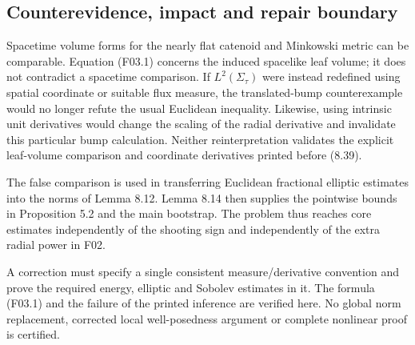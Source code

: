 \documentclass[10pt]{article}
\begin{document}
\subsection*{Counterevidence, impact and repair boundary}
Spacetime volume forms for the nearly flat catenoid and Minkowski metric can be comparable. Equation (F03.1) concerns the induced spacelike leaf volume; it does not contradict a spacetime comparison. If \(L^2(\Sigma_\tau)\) were instead redefined using spatial coordinate or suitable flux measure, the translated-bump counterexample would no longer refute the usual Euclidean inequality. Likewise, using intrinsic unit derivatives would change the scaling of the radial derivative and invalidate this particular bump calculation. Neither reinterpretation validates the explicit leaf-volume comparison and coordinate derivatives printed before (8.39).\par
The false comparison is used in transferring Euclidean fractional elliptic estimates into the norms of Lemma 8.12. Lemma 8.14 then supplies the pointwise bounds in Proposition 5.2 and the main bootstrap. The problem thus reaches core estimates independently of the shooting sign and independently of the extra radial power in F02.\par
A correction must specify a single consistent measure/derivative convention and prove the required energy, elliptic and Sobolev estimates in it. The formula (F03.1) and the failure of the printed inference are verified here. No global norm replacement, corrected local well-posedness argument or complete nonlinear proof is certified.\par
\end{document}

